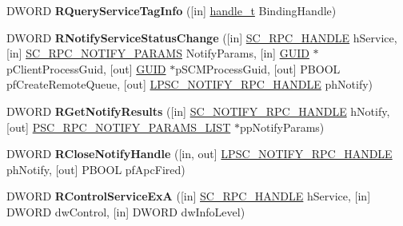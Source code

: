 \begin{DoxyCompactItemize}
\item 
\mbox{\label{interfacesvcctl_acdef85c10b7016b9dd0aa04ae9e5b8c9}} 
D\+W\+O\+RD {\bfseries R\+Query\+Service\+Tag\+Info} (\mbox{[}in\mbox{]} \hyperlink{interfacevoid}{handle\+\_\+t} Binding\+Handle)
\item 
\mbox{\label{interfacesvcctl_a8c56c63ba116415e3f21606928e82584}} 
D\+W\+O\+RD {\bfseries R\+Notify\+Service\+Status\+Change} (\mbox{[}in\mbox{]} \hyperlink{interfacevoid}{S\+C\+\_\+\+R\+P\+C\+\_\+\+H\+A\+N\+D\+LE} h\+Service, \mbox{[}in\mbox{]} \hyperlink{struct___s_c___r_p_c___n_o_t_i_f_y___p_a_r_a_m_s}{S\+C\+\_\+\+R\+P\+C\+\_\+\+N\+O\+T\+I\+F\+Y\+\_\+\+P\+A\+R\+A\+MS} Notify\+Params, \mbox{[}in\mbox{]} \hyperlink{interface_g_u_i_d}{G\+U\+ID} $\ast$p\+Client\+Process\+Guid, \mbox{[}out\mbox{]} \hyperlink{interface_g_u_i_d}{G\+U\+ID} $\ast$p\+S\+C\+M\+Process\+Guid, \mbox{[}out\mbox{]} P\+B\+O\+OL pf\+Create\+Remote\+Queue, \mbox{[}out\mbox{]} \hyperlink{interfacevoid}{L\+P\+S\+C\+\_\+\+N\+O\+T\+I\+F\+Y\+\_\+\+R\+P\+C\+\_\+\+H\+A\+N\+D\+LE} ph\+Notify)
\item 
\mbox{\label{interfacesvcctl_ae5c5c175bcf2bb886af2207528f8dbac}} 
D\+W\+O\+RD {\bfseries R\+Get\+Notify\+Results} (\mbox{[}in\mbox{]} \hyperlink{interfacevoid}{S\+C\+\_\+\+N\+O\+T\+I\+F\+Y\+\_\+\+R\+P\+C\+\_\+\+H\+A\+N\+D\+LE} h\+Notify, \mbox{[}out\mbox{]} \hyperlink{struct___s_c___r_p_c___n_o_t_i_f_y___p_a_r_a_m_s___l_i_s_t}{P\+S\+C\+\_\+\+R\+P\+C\+\_\+\+N\+O\+T\+I\+F\+Y\+\_\+\+P\+A\+R\+A\+M\+S\+\_\+\+L\+I\+ST} $\ast$pp\+Notify\+Params)
\item 
\mbox{\label{interfacesvcctl_a55ff49109d42ebec54dea50fac8794b3}} 
D\+W\+O\+RD {\bfseries R\+Close\+Notify\+Handle} (\mbox{[}in, out\mbox{]} \hyperlink{interfacevoid}{L\+P\+S\+C\+\_\+\+N\+O\+T\+I\+F\+Y\+\_\+\+R\+P\+C\+\_\+\+H\+A\+N\+D\+LE} ph\+Notify, \mbox{[}out\mbox{]} P\+B\+O\+OL pf\+Apc\+Fired)
\item 
\mbox{\label{interfacesvcctl_afeb3041803a42ee358c4b9625e3a4a43}} 
D\+W\+O\+RD {\bfseries R\+Control\+Service\+ExA} (\mbox{[}in\mbox{]} \hyperlink{interfacevoid}{S\+C\+\_\+\+R\+P\+C\+\_\+\+H\+A\+N\+D\+LE} h\+Service, \mbox{[}in\mbox{]} D\+W\+O\+RD dw\+Control, \mbox{[}in\mbox{]} D\+W\+O\+RD dw\+Info\+Level)
\item 

\end{DoxyCompactItemize}
